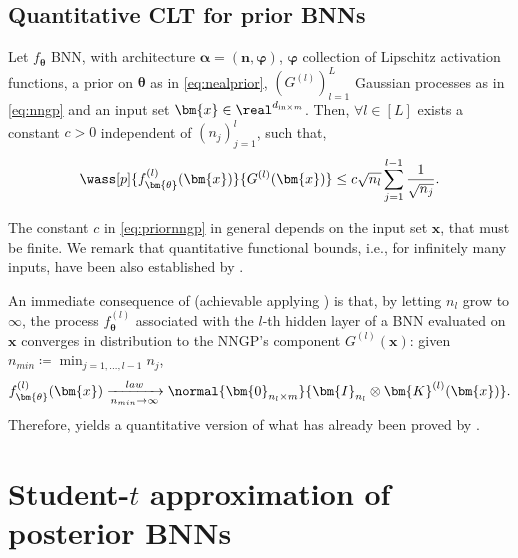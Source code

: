 \subsection{Quantitative CLT for prior BNNs} 

\begin{theorem} \label{thm:priornngp}
    Let $f_{\bm{\theta}}$ BNN, with architecture $\bm{\alpha} = (\bm{n}, \bm{\varphi})$, $\bm{\varphi}$ collection of Lipschitz activation functions, a prior on $\bm{\theta}$ as in \cref{eq:nealprior}, $\left(G^{(l)}\right)_{l = 1}^L$ Gaussian processes as in \cref{eq:nngp} and an input set $\bm{x} \in \real^{d_{\mathrm{in} \times m}}$. Then, $\forall l \in [L]$ exists a constant $c > 0$ independent of $\left(n_j\right)_{j = 1}^l$, such that,
    \begin{equation} \label{eq:priornngp}
        \wass[p]{f_{\bm{\theta}}^{(l)}(\bm{x})}{G^{(l)}(\bm{x})} \leq c \sqrt{n_l} \sum_{j = 1}^{l - 1} \frac{1}{\sqrt{n_j}}.
    \end{equation}
\end{theorem}

The constant $c$ in \cref{eq:priornngp} in general depends on the input set $\bm{x}$, that must be finite. We remark that quantitative functional bounds, i.e., for infinitely many inputs, have been also established by \citet{favaro2024}.

\begin{remark} \label{rem:gaussposterior}
    An immediate consequence of  (achievable applying ) is that, by letting $n_l$ grow to $\infty$, the process $f^{(l)}_{\bm{\theta}}$ associated with the $l$-th hidden layer of a BNN evaluated on $\bm{x}$ converges in distribution to the NNGP's component $G^{(l)}(\bm{x})$: given $n_{min} \coloneqq \min_{j = 1, \dots, l - 1} n_j$,
    \begin{equation*}
        f^{(l)}_{\bm{\theta}}(\bm{x}) \xrightarrow[n_{min} \to \infty]{law} \normal{\bm{0}_{n_l \times m}}{\bm{I}_{n_l} \otimes \bm{K}^{(l)}(\bm{x})}.
    \end{equation*} 
    Therefore,  yields a quantitative version of what has already been proved by \citet{matthews2018,lee2018}.	
\end{remark}

\section{\texorpdfstring{Student-$t$}{Student-t} approximation of posterior BNNs} \label{sec:mainresult}

